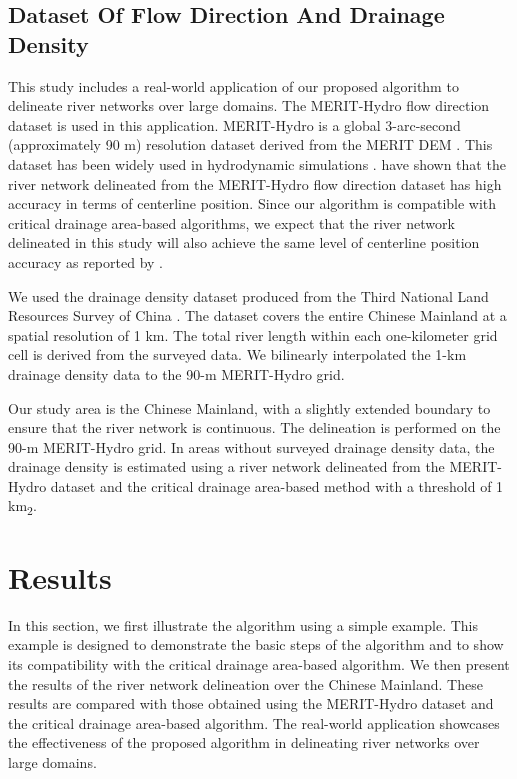 \documentclass[water,article,submit,pdftex,moreauthors]{Definitions/mdpi}
\begin{document}
\subsection{Dataset Of Flow Direction And Drainage Density}

This study includes a real-world application of our proposed algorithm to delineate river networks over large domains. The MERIT-Hydro flow direction dataset \citep{yamazaki2019WRR} is used in this application. MERIT-Hydro is a global 3-arc-second (approximately 90 m) resolution dataset derived from the MERIT DEM \citep{yamazaki2017GRL}. This dataset has been widely used in hydrodynamic simulations \citep{yang2021BAMS}. \citet{lin2021SD} have shown that the river network delineated from the MERIT-Hydro flow direction dataset has high accuracy in terms of centerline position. Since our algorithm is compatible with critical drainage area-based algorithms, we expect that the river network delineated in this study will also achieve the same level of centerline position accuracy as reported by \citet{lin2021SD}.

We used the drainage density dataset produced from the Third National Land Resources Survey of China \citep{zhang2024CDB}. The dataset covers the entire Chinese Mainland at a spatial resolution of 1 km. The total river length within each one-kilometer grid cell is derived from the surveyed data. We bilinearly interpolated the 1-km drainage density data to the 90-m MERIT-Hydro grid.

Our study area is the Chinese Mainland, with a slightly extended boundary to ensure that the river network is continuous. The delineation is performed on the 90-m MERIT-Hydro grid. In areas without surveyed drainage density data, the drainage density is estimated using a river network delineated from the MERIT-Hydro dataset and the critical drainage area-based method with a threshold of 1 km\textsubscript{2}.

\section{Results}
\label{sec:results}

In this section, we first illustrate the algorithm using a simple example. This example is designed to demonstrate the basic steps of the algorithm and to show its compatibility with the critical drainage area-based algorithm. We then present the results of the river network delineation over the Chinese Mainland. These results are compared with those obtained using the MERIT-Hydro dataset and the critical drainage area-based algorithm. The real-world application showcases the effectiveness of the proposed algorithm in delineating river networks over large domains.
\end{document}
